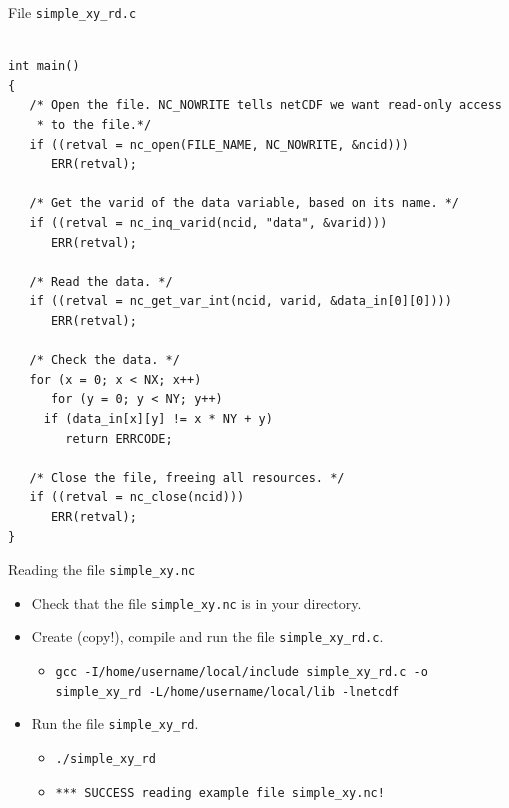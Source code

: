 \documentclass[compress,11pt,xcolor=svgnames,aspectratio=169]{beamer}
\begin{document}
\begin{frame}[fragile]{File \texttt{simple\_xy\_rd.c}}

{\tiny

\begin{verbatim}

int main()
{
   /* Open the file. NC_NOWRITE tells netCDF we want read-only access
    * to the file.*/
   if ((retval = nc_open(FILE_NAME, NC_NOWRITE, &ncid)))
      ERR(retval);

   /* Get the varid of the data variable, based on its name. */
   if ((retval = nc_inq_varid(ncid, "data", &varid)))
      ERR(retval);

   /* Read the data. */
   if ((retval = nc_get_var_int(ncid, varid, &data_in[0][0])))
      ERR(retval);

   /* Check the data. */
   for (x = 0; x < NX; x++)
      for (y = 0; y < NY; y++)
	 if (data_in[x][y] != x * NY + y)
	    return ERRCODE;

   /* Close the file, freeing all resources. */
   if ((retval = nc_close(ncid)))
      ERR(retval);
}

\end{verbatim}

}

\end{frame}

\begin{frame}[fragile]{Reading the file \texttt{simple\_xy.nc}}

\begin{itemize}
\setlength\itemsep{0.6cm}

  \item Check that the file \verb|simple_xy.nc| is in your directory.

  \item Create (copy!), compile and run the file \verb|simple_xy_rd.c|.\\[0.4cm]

        \begin{itemize}
          \item {\tiny  \verb|gcc -I/home/username/local/include simple_xy_rd.c -o simple_xy_rd -L/home/username/local/lib -lnetcdf| }\\[0.4cm]
        \end{itemize}

  \item Run the file \verb|simple_xy_rd|.

        \begin{itemize}
          \item {\tiny  \verb|./simple_xy_rd|}
          \item {\tiny  \verb|*** SUCCESS reading example file simple_xy.nc!|}
        \end{itemize}

\end{itemize}

\end{frame}
\end{document}
